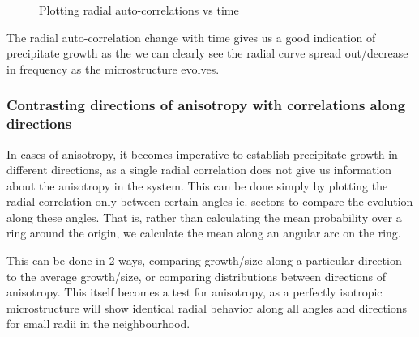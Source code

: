 \documentclass[12pt, a4paper]{report}
\begin{document}
\begin{figure}[H]
\caption{Plotting radial auto-correlations vs time}
\label{fig:unexplainablePlot}
\end{figure}

The radial auto-correlation change with time gives us a good indication of precipitate growth as the we can clearly see the radial curve spread out/decrease in frequency as the microstructure evolves.


\subsubsection{Contrasting directions of anisotropy with correlations along directions}
In cases of anisotropy, it becomes imperative to establish precipitate growth in different directions, as a single radial correlation does not give us information about the anisotropy in the system. This can be done simply by plotting the radial correlation only between certain angles ie. sectors to compare the evolution along these angles. That is, rather than calculating the mean probability over a ring around the origin, we calculate the mean along an angular arc on the ring. 

This can be done in 2 ways, comparing growth/size along a particular direction to the average growth/size, or comparing distributions between directions of anisotropy. This itself becomes a test for anisotropy, as a perfectly isotropic microstructure will show identical radial behavior along all angles and directions for small radii in the neighbourhood.
\end{document}
